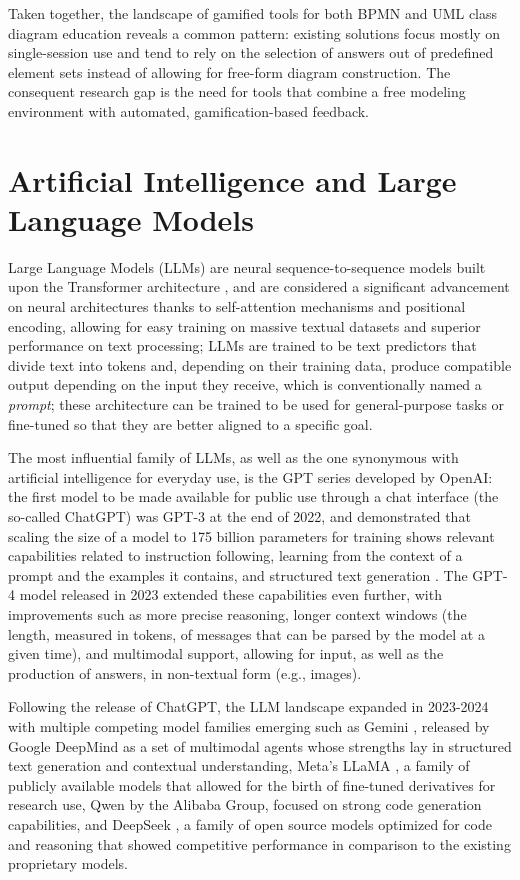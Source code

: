 {{Taken together, the landscape of gamified tools for both BPMN and UML class diagram education reveals a common pattern: existing solutions focus mostly on single-session use and tend to rely on the selection of answers out of predefined element sets instead of allowing for free-form diagram construction. The consequent research gap is the need for tools that combine a free modeling environment with automated, gamification-based feedback.

\section{Artificial Intelligence and Large Language Models}

Large Language Models (LLMs) are neural sequence-to-sequence models built upon the Transformer architecture \cite{vaswani2017attention}, and are considered a significant advancement on neural architectures thanks to self-attention mechanisms and positional encoding, allowing for easy training on massive textual datasets and superior performance on text processing; LLMs are trained to be text predictors that divide text into tokens and, depending on their training data, produce compatible output depending on the input they receive, which is conventionally named a \textit{prompt}; these architecture can be trained to be used for general-purpose tasks or fine-tuned so that they are better aligned to a specific goal.

The most influential family of LLMs, as well as the one synonymous with artificial intelligence for everyday use, is the GPT series developed by OpenAI: the first model to be made available for public use through a chat interface (the so-called ChatGPT) was GPT-3 at the end of 2022, and demonstrated that scaling the size of a model to 175 billion parameters for training shows relevant capabilities related to instruction following, learning from the context of a prompt and the examples it contains, and structured text generation \cite{brown2020language}. The GPT-4 model released in 2023 \cite{openai2023gpt4} extended these capabilities even further, with improvements such as more precise reasoning, longer context windows (the length, measured in tokens, of messages that can be parsed by the model at a given time), and multimodal support, allowing for input, as well as the production of answers, in non-textual form (e.g., images).

Following the release of ChatGPT, the LLM landscape expanded in 2023-2024 with multiple competing model families emerging such as Gemini \cite{anil2023gemini}, released by Google DeepMind as a set of multimodal agents whose strengths lay in structured text generation and contextual understanding, Meta's LLaMA \cite{touvron2023llama}, a family of publicly available models that allowed for the birth of fine-tuned derivatives for research use, Qwen \cite{bai2023qwen} by the Alibaba Group, focused on strong code generation capabilities, and DeepSeek \cite{deepseek2024}, a family of open source models optimized for code and reasoning that showed competitive performance in comparison to the existing proprietary models.

}}
